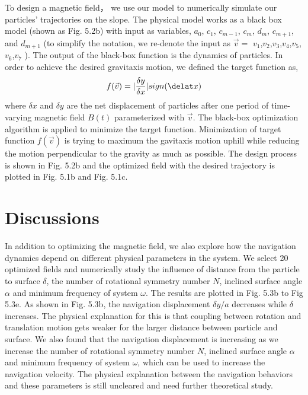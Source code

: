 To design a magnetic field， we use our model to numerically simulate our particles' trajectories on the slope. The physical model works as a black box model (shown as Fig. 5.2b) with input as variables, $a_0$, $c_1$, $c_{m-1}$, $c_{m}$, $d_{m}$, $c_{m+1}$, and $d_{m+1}$ (to simplify the notation, we re-denote the input as $\vec{v}=$ $v_1$,$v_2$,$v_3$,$v_4$,$v_5$,$v_6$,$v_7$  ). The output of the black-box function is the dynamics of particles. In order to achieve the desired gravitaxis motion, we defined the target function as,
\begin{equation}
    f(\vec{v})=|\frac{\delta y}{\delta x}| sign(\delat x)
\end{equation}
where $\delta x$ and $\delta y$ are the net displacement of particles after one period of  time-varying magnetic field $B(t)$ parameterized with $\vec{v}$.
The black-box optimization algorithm is applied to minimize the target function\autocite{dou2019autonomous}. Minimization of target function $f(\vec{v})$ is trying to maximum the gavitaxis motion uphill while reducing the motion perpendicular to the gravity as much as possible. The design process is shown in Fig. 5.2b and the optimized field with the desired trajectory is plotted in Fig. 5.1b and Fig. 5.1c.


 
\section{Discussions}
In addition to optimizing the magnetic field, we also explore how the navigation dynamics depend on different physical parameters in the system. We select 20 optimized fields and numerically study the influence of distance from the particle to surface $\delta$, the number of  rotational symmetry number $N$, inclined surface angle $\alpha$ and  minimum frequency of system  $\omega$. The results are plotted in Fig. 5.3b to Fig 5.3e. As shown in Fig. 5.3b, the navigation displacement $\delta y/a$ decreases while $\delta$ increases. The physical explanation for this is that coupling between rotation and translation motion gets weaker for the larger distance between particle and surface. We also found that the navigation displacement is increasing as we increase the   number of  rotational symmetry number $N$, inclined surface angle $\alpha$ and  minimum frequency of system  $\omega$, which can be used to increase the navigation velocity. The physical explanation between the navigation behaviors and these parameters is still uncleared and need further theoretical study. 



